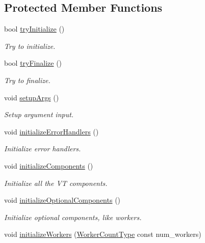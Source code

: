 \subsection*{Protected Member Functions}
\begin{DoxyCompactItemize}
\item 
bool \hyperlink{structvt_1_1runtime_1_1_runtime_a651174e20fa3db2493bd4c0cf2e8be3c}{try\+Initialize} ()
\begin{DoxyCompactList}\small\item\em Try to initialize. \end{DoxyCompactList}\item 
bool \hyperlink{structvt_1_1runtime_1_1_runtime_a6d4863db7bf256c2c654fab6466df2a4}{try\+Finalize} ()
\begin{DoxyCompactList}\small\item\em Try to finalize. \end{DoxyCompactList}\item 
void \hyperlink{structvt_1_1runtime_1_1_runtime_ab1dc72260d0003004cce1418a8880aa7}{setup\+Args} ()
\begin{DoxyCompactList}\small\item\em Setup argument input. \end{DoxyCompactList}\item 
void \hyperlink{structvt_1_1runtime_1_1_runtime_adf6407cff70ac8c332d75911a81b508d}{initialize\+Error\+Handlers} ()
\begin{DoxyCompactList}\small\item\em Initialize error handlers. \end{DoxyCompactList}\item 
void \hyperlink{structvt_1_1runtime_1_1_runtime_a798be8c8813889ef0aacdbc8668d8a41}{initialize\+Components} ()
\begin{DoxyCompactList}\small\item\em Initialize all the VT components. \end{DoxyCompactList}\item 
void \hyperlink{structvt_1_1runtime_1_1_runtime_a61abc4a1b440263bd129ee0950a05e69}{initialize\+Optional\+Components} ()
\begin{DoxyCompactList}\small\item\em Initialize optional components, like workers. \end{DoxyCompactList}\item 
void \hyperlink{structvt_1_1runtime_1_1_runtime_a264ccc1306fc3b5dfc20830fa313cba0}{initialize\+Workers} (\hyperlink{namespacevt_aa93398ea48f2cb6c188512250f7cc248}{Worker\+Count\+Type} const num\+\_\+workers)

\end{DoxyCompactItemize}
